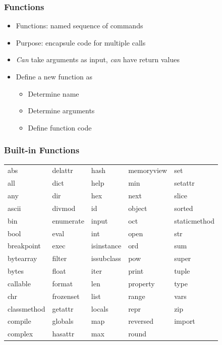 \documentclass[ngerman]{beamer}
\begin{document}
\begin{frame}
\frametitle{Functions}

\begin{itemize}
\item Functions: named sequence of commands
\item Purpose: encapsule code for multiple calls
\item \textit{Can} take arguments as input, \textit{can} have return values
\item Define a new function as
\begin{itemize}
	\item Determine name
	\item Determine arguments
	\item Define function code
	\end{itemize}
\end{itemize}
\end{frame}


\begin{frame}
\frametitle{Built-in Functions}

\begin{tabular}{lllll}
abs	&	delattr	&	hash	&	memoryview	&	set	\\
all	&	dict	&	help	&	min	&	setattr	\\
any	&	dir	&	hex	&	next	&	slice	\\
ascii	&	divmod	&	id	&	object	&	sorted	\\
bin	&	enumerate	&	input	&	oct	&	staticmethod	\\
bool	&	eval	&	int	&	open	&	str	\\
breakpoint	&	exec	&	isinstance	&	ord	&	sum	\\
bytearray	&	filter	&	issubclass	&	pow	&	super	\\
bytes	&	float	&	iter	&	print	&	tuple	\\
callable	&	format	&	len	&	property	&	type	\\
chr	&	frozenset	&	list	&	range	&	vars	\\
classmethod	&	getattr	&	locals	&	repr	&	zip	\\
compile	&	globals	&	map	&	reversed	&	\textunderscore \textunderscore import \textunderscore \textunderscore	\\
complex	&	hasattr	&	max	&	round	&		\\
\end{tabular}
\end{frame}
\end{document}
